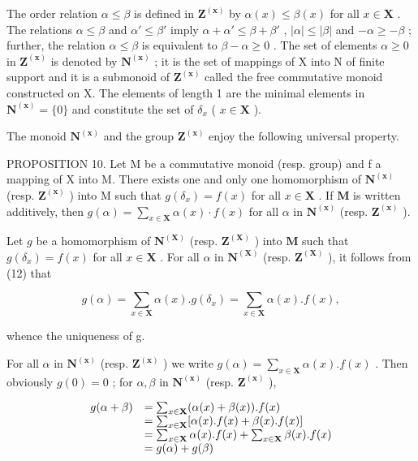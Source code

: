 The order relation \(\alpha \leqslant \beta\) is defined in \(\mathbf{Z}^{(\mathbf{x})}\) by \(\alpha(x) \leqslant \beta(x)\) for all \(x \in \mathbf{X}\) . The relations \(\alpha \leqslant \beta\) and \(\alpha' \leqslant \beta'\) imply \(\alpha + \alpha' \leqslant \beta + \beta'\) , \(|\alpha| \leqslant |\beta|\) and \(-\alpha \geqslant -\beta\) ; further, the relation \(\alpha \leqslant \beta\) is equivalent to \(\beta - \alpha \geqslant 0\) . The set of elements \(\alpha \geqslant 0\) in \(\mathbf{Z}^{(\mathbf{x})}\) is denoted by \(\mathbf{N}^{(\mathbf{x})}\) ; it is the set of mappings of X into N of finite support and it is a submonoid of \(\mathbf{Z}^{(\mathbf{x})}\) called the free commutative monoid constructed on X. The elements of length 1 are the minimal elements in \(\mathbf{N}^{(\mathbf{x})} = \{0\}\) and constitute the set of \(\delta_x\) ( \(x \in \mathbf{X}\) ).

The monoid \(\mathbf{N}^{(\mathbf{x})}\) and the group \(\mathbf{Z}^{(\mathbf{x})}\) enjoy the following universal property.

PROPOSITION 10. Let M be a commutative monoid (resp. group) and f a mapping of X into M. There exists one and only one homomorphism of \(\mathbf{N}^{(\mathbf{x})}\) (resp. \(\mathbf{Z}^{(\mathbf{x})}\) ) into M such that \(g(\delta_x) = f(x)\) for all \(x \in \mathbf{X}\) . If \(\mathbf{M}\) is written additively, then \(g(\alpha) = \sum_{x \in \mathbf{X}} \alpha(x) \cdot f(x)\) for all \(\alpha\) in \(\mathbf{N}^{(\mathbf{x})}\) (resp. \(\mathbf{Z}^{(\mathbf{x})}\) ).

Let \(g\) be a homomorphism of \(\mathbf{N}^{(\mathbf{X})}\) (resp. \(\mathbf{Z}^{(\mathbf{X})}\) ) into \(\mathbf{M}\) such that \(g(\delta_x) = f(x)\) for all \(x \in \mathbf{X}\) . For all \(\alpha\) in \(\mathbf{N}^{(\mathbf{X})}\) (resp. \(\mathbf{Z}^{(\mathbf{X})}\) ), it follows from (12) that

\[
g (\alpha) = \sum_ {x \in \mathbf {X}} \alpha (x). g (\delta_ {x}) = \sum_ {x \in \mathbf {X}} \alpha (x). f (x),
\]

whence the uniqueness of g.

For all \(\alpha\) in \(\mathbf{N}^{(\mathbf{x})}\) (resp. \(\mathbf{Z}^{(\mathbf{x})}\) ) we write \(g(\alpha) = \sum_{x\in \mathbf{X}}\alpha (x).f(x)\) . Then obviously \(g(0) = 0\) ; for \(\alpha, \beta\) in \(\mathbf{N}^{(\mathbf{x})}\) (resp. \(\mathbf{Z}^{(\mathbf{x})}\) ),

\[
\begin{array}{r l} g (\alpha + \beta) & = \sum_ {x \in \mathbf {X}} (\alpha (x) + \beta (x)). f (x) \\ & = \sum_ {x \in \mathbf {X}} [ \alpha (x). f (x) + \beta (x). f (x) ] \\ & = \sum_ {x \in \mathbf {X}} \alpha (x). f (x) + \sum_ {x \in \mathbf {X}} \beta (x). f (x) \\ & = g (\alpha) + g (\beta) \end{array}
\]

